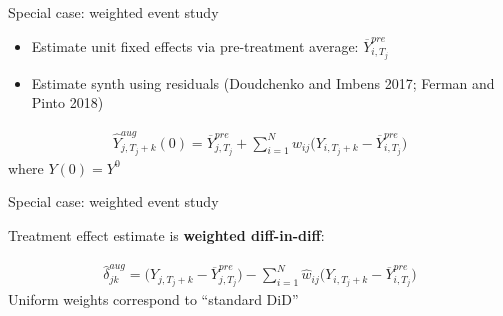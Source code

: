 \documentclass{beamer}
\begin{document}
\begin{frame}{Special case: weighted event study}

\begin{itemize}
\item Estimate unit fixed effects via pre-treatment average: $\overline{Y}_{i,T_j}^{pre}$
\item Estimate synth using residuals (Doudchenko and Imbens 2017; Ferman and Pinto 2018)
\end{itemize}


\begin{eqnarray*}
\widehat{Y}^{aug}_{j,T_j+k}(0) = \overline{Y}_{j,T_j}^{pre} + \sum_{i=1}^N \widehat{w}_{ij} \bigg ( Y_{i,T_j+k} - \overline{Y}_{i,T_j}^{pre} \bigg )
\end{eqnarray*}where $Y(0)=Y^0$

\end{frame}

\begin{frame}{Special case: weighted event study}

Treatment effect estimate is \textbf{weighted diff-in-diff}:

\begin{eqnarray*}
\widehat{\delta}_{jk}^{aug} = \bigg ( Y_{j,T_j+k} - \overline{Y}_{j,T_j}^{pre} \bigg ) - \sum_{i=1}^N \widehat{w}_{ij} \bigg (Y_{i,T_j+k} - \overline{Y}_{i,T_j}^{pre} \bigg )
\end{eqnarray*}Uniform weights correspond to ``standard DiD''

\end{frame}
\end{document}
